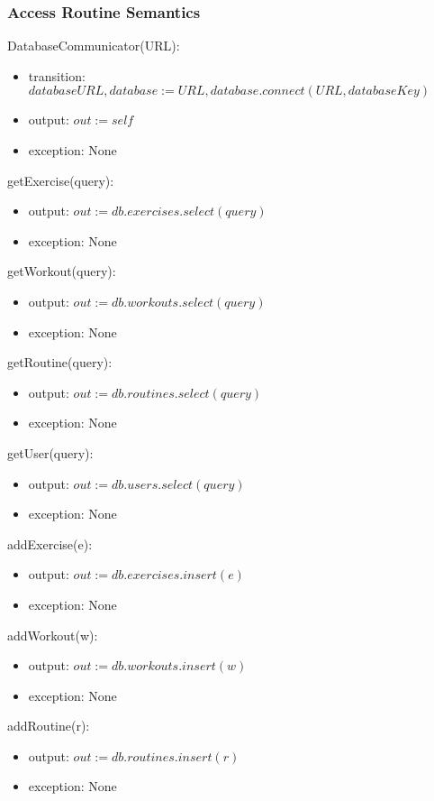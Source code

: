 \documentclass[12pt, titlepage]{article}
\begin{document}
\subsubsection{Access Routine Semantics}

DatabaseCommunicator(URL):
\begin{itemize}
	\item transition: $databaseURL, database := URL, database.connect(URL, databaseKey)$
	\item output: $out := self$
	\item exception: None
\end{itemize}

getExercise(query):
\begin{itemize}
	\item output: $out := db.exercises.select(query)$
	\item exception: None
\end{itemize}

getWorkout(query):
\begin{itemize}
	\item output: $out := db.workouts.select(query)$
	\item exception: None
\end{itemize}

getRoutine(query):
\begin{itemize}
	\item output: $out := db.routines.select(query)$
	\item exception: None
\end{itemize}

getUser(query):
\begin{itemize}
	\item output: $out := db.users.select(query)$
	\item exception: None
\end{itemize}


addExercise(e):
\begin{itemize}
	\item output: $out := db.exercises.insert(e)$
	\item exception: None
\end{itemize}

addWorkout(w):
\begin{itemize}
	\item output: $out := db.workouts.insert(w)$
	\item exception: None
\end{itemize}

addRoutine(r):
\begin{itemize}
	\item output: $out := db.routines.insert(r)$
	\item exception: None
\end{itemize}
\end{document}
